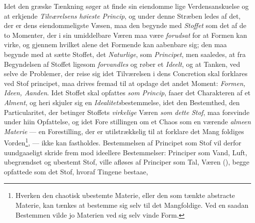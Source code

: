 Idet den græske Tænkning søger at finde sin eiendomme\-%
lige Verdensanskuelse og at erkjende \emph{Tilværelsens høieste
Princip}, og under denne Stræben ledes af det, der er dens
eiendommeligste Væsen, maa den begynde med \emph{Stoffet} som
det af de to Momenter, der i sin umiddelbare Væren maa være
\emph{forudsat} for at Formen kan virke, og gjennem hvilket alene
det Formende kan aabenbare sig; den maa begynde med at
sætte Stoffet, det \emph{Naturlige}, som \emph{Principet}, men saaledes,
at fra Begyndelsen af Stoffet ligesom \emph{forvandles} og røber
et \emph{Ideelt}, og at Tanken, ved selve de Problemer, der reise
sig idet Tilværelsen i dens Concretion skal forklares ved Stof\-%
principet, maa drives fremad til at opdage det andet Moment:
\emph{Formen, Ideen, Aanden}. Idet Stoffet skal opfattes \emph{som
Princip}, faaer det Charakteren af et \emph{Alment}, og heri
skjuler sig en \emph{Idealitets}bestemmelse, idet den Bestemthed,
den Particularitet, der betinger Stoffets \emph{virkelige} Væren \emph{som
dette Stof}, maa forsvinde under hiin Opfattelse, og idet Fore\-%
stillingen om et Chaos som en værende \emph{almeen Materie} ---
en Forestilling, der er utilstrækkelig til at forklare det Mang\-%
foldiges Vorden\footnote{Hverken den chaotisk ubestemte Materie, eller den som 
tænkte abstracte Materie, kan tænkes at bestemme sig selv til det
Mangfoldige. Ved en saadan Bestemmen vilde jo Materien ved sig
selv vinde Form.}, --- ikke kan fastholdes. Bestemmelsen af
Principet som Stof vil derfor uundgaaeligt skride frem mod
ideellere Bestemmelser: Principer som Vand, Luft, ubegrændset
og ubestemt Stof, ville afløses af Principer som Tal, Væren
(), begge opfattede som det Stof, hvoraf Tingene bestaae,
